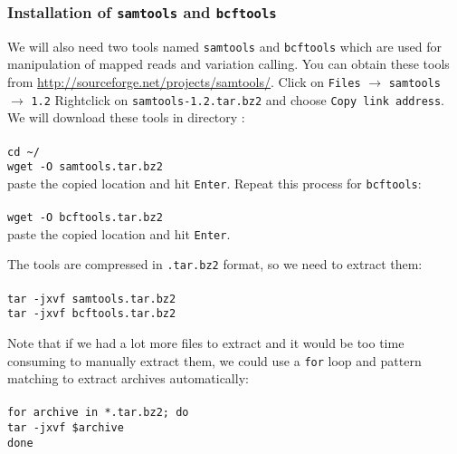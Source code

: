 \subsubsection{Installation of \texttt{samtools} and \texttt{bcftools}}
We will also need two tools named \texttt{samtools} and \texttt{bcftools} which are used for
manipulation of mapped reads and variation calling. You can obtain these tools from
\url{http://sourceforge.net/projects/samtools/}. Click on \texttt{Files} $\rightarrow$ \texttt{samtools} $\rightarrow$ \texttt{1.2}
Rightclick on \texttt{samtools-1.2.tar.bz2} and choose \texttt{Copy link address}. 
We will download these tools in directory \texttt{\progDir}:\\~\\
\texttt{cd \textasciitilde/\progDir}\\
\texttt{wget -O samtools.tar.bz2}\\

paste the copied location and hit \texttt{Enter}.
Repeat this process for \texttt{bcftools}:\\~\\
\texttt{wget -O bcftools.tar.bz2}\\
paste the copied location and hit \texttt{Enter}.

The tools are compressed in \texttt{.tar.bz2}
format, so we need to extract them:\\~\\
\texttt{tar -jxvf samtools.tar.bz2}\\
\texttt{tar -jxvf bcftools.tar.bz2}\\

\begin{framed}
Note that if we had a lot more files to extract and it would be too
time consuming to manually extract them, we could use a \texttt{for}
loop and pattern matching to extract archives automatically:\\~\\
\texttt{for archive in *.tar.bz2; do}\\
\texttt{\indent tar -jxvf \$archive}\\
\texttt{done}
\end{framed}

